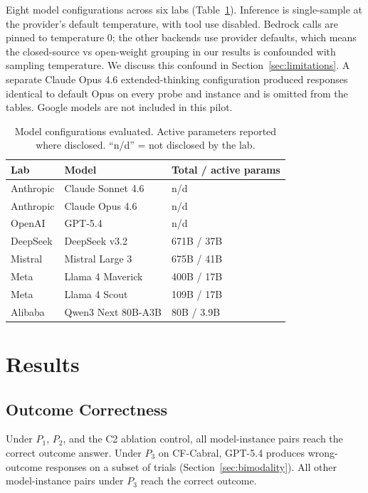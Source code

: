 \documentclass[11pt]{article}
\begin{document}
Eight model configurations across six labs (Table~\ref{tab:models}). Inference is single-sample at the provider's default temperature, with tool use disabled. Bedrock calls are pinned to temperature $0$; the other backends use provider defaults, which means the closed-source vs open-weight grouping in our results is confounded with sampling temperature. We discuss this confound in Section~\ref{sec:limitations}. A separate Claude Opus 4.6 extended-thinking configuration produced responses identical to default Opus on every probe and instance and is omitted from the tables. Google models are not included in this pilot.

\begin{table}[t]
\centering
\caption{Model configurations evaluated. Active parameters reported where disclosed. ``n/d'' = not disclosed by the lab.}
\label{tab:models}
\small
\begin{tabular}{@{}lll@{}}
\toprule
\textbf{Lab} & \textbf{Model} & \textbf{Total / active params} \\
\midrule
Anthropic & Claude Sonnet 4.6 & n/d \\
Anthropic & Claude Opus 4.6 & n/d \\
OpenAI & GPT-5.4 & n/d \\
DeepSeek & DeepSeek v3.2 & 671B / 37B \\
Mistral & Mistral Large 3 & 675B / 41B \\
Meta & Llama 4 Maverick & 400B / 17B \\
Meta & Llama 4 Scout & 109B / 17B \\
Alibaba & Qwen3 Next 80B-A3B & 80B / 3.9B \\
\bottomrule
\end{tabular}
\end{table}

\section{Results}
\label{sec:results}

\subsection{Outcome Correctness}

Under $P_1$, $P_2$, and the C2 ablation control, all model-instance pairs reach the correct outcome answer. Under $P_3$ on CF-Cabral, GPT-5.4 produces wrong-outcome responses on a subset of trials (Section~\ref{sec:bimodality}). All other model-instance pairs under $P_3$ reach the correct outcome.
\end{document}
